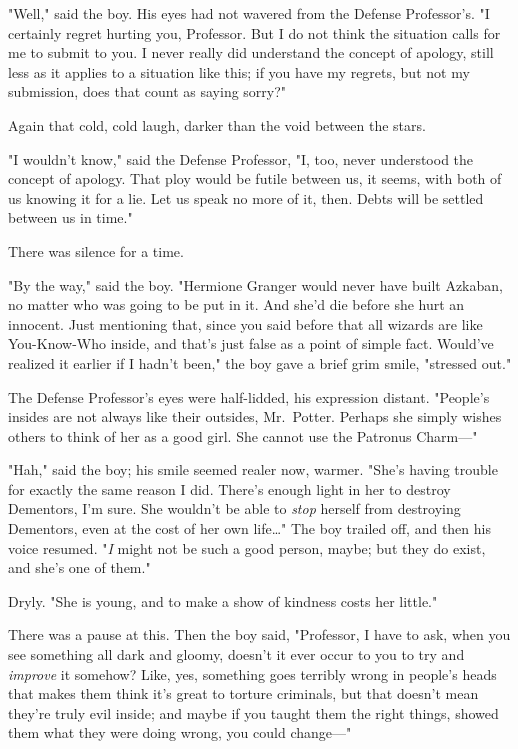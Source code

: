 "Well," said the boy. His eyes had not wavered from the Defense Professor's. "I
certainly regret hurting you, Professor. But I do not think the situation calls
for me to submit to you. I never really did understand the concept of apology,
still less as it applies to a situation like this; if you have my regrets, but
not my submission, does that count as saying sorry?"

Again that cold, cold laugh, darker than the void between the stars.

"I wouldn't know," said the Defense Professor, "I, too, never understood the
concept of apology. That ploy would be futile between us, it seems, with both
of us knowing it for a lie. Let us speak no more of it, then. Debts will be
settled between us in time."

There was silence for a time.

"By the way," said the boy. "Hermione Granger would never have built Azkaban,
no matter who was going to be put in it. And she'd die before she hurt an
innocent. Just mentioning that, since you said before that all wizards are like
You-Know-Who inside, and that's just false as a point of simple fact. Would've
realized it earlier if I hadn't been," the boy gave a brief grim smile,
"stressed out."

The Defense Professor's eyes were half-lidded, his expression distant.
"People's insides are not always like their outsides, Mr.~Potter. Perhaps she
simply wishes others to think of her as a good girl. She cannot use the
Patronus Charm---"

"Hah," said the boy; his smile seemed realer now, warmer. "She's having trouble
for exactly the same reason I did. There's enough light in her to destroy
Dementors, I'm sure. She wouldn't be able to \emph{stop} herself from
destroying Dementors, even at the cost of her own life{\ldots}" The boy trailed
off, and then his voice resumed. "\emph{I} might not be such a good person,
maybe; but they do exist, and she's one of them."

Dryly. "She is young, and to make a show of kindness costs her little."

There was a pause at this. Then the boy said, "Professor, I have to ask, when
you see something all dark and gloomy, doesn't it ever occur to you to try and
\emph{improve} it somehow? Like, yes, something goes terribly wrong in people's
heads that makes them think it's great to torture criminals, but that doesn't
mean they're truly evil inside; and maybe if you taught them the right things,
showed them what they were doing wrong, you could change---"

